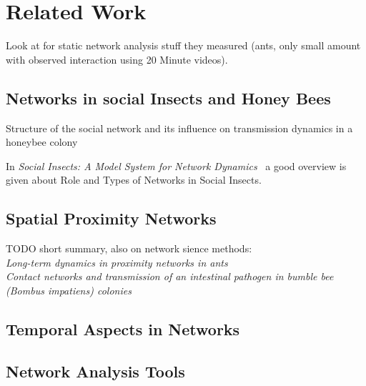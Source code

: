 \chapter{Related Work}
\label{ch:relatedwork}

Look at \cite{quevillon2015social} for static network analysis stuff they measured (ants, only small amount with observed interaction using 20 Minute videos).

\section{Networks in social Insects and Honey Bees}
Structure of the social network and its influence on transmission dynamics in a honeybee colony

In \emph{Social Insects: A Model System for Network Dynamics}~\cite{charbonneau2013social} a good overview is given about Role and Types of Networks in Social Insects.

\section{Spatial Proximity Networks}

TODO short summary, also on network sience methods:\\
\emph{Long-term dynamics in proximity networks in ants}~\cite{jeanson2012long}\\

\emph{Contact networks and transmission of an intestinal pathogen in bumble bee (Bombus impatiens) colonies}~\cite{otterstatter2007contact}

\section{Temporal Aspects in Networks}

\section{Network Analysis Tools}